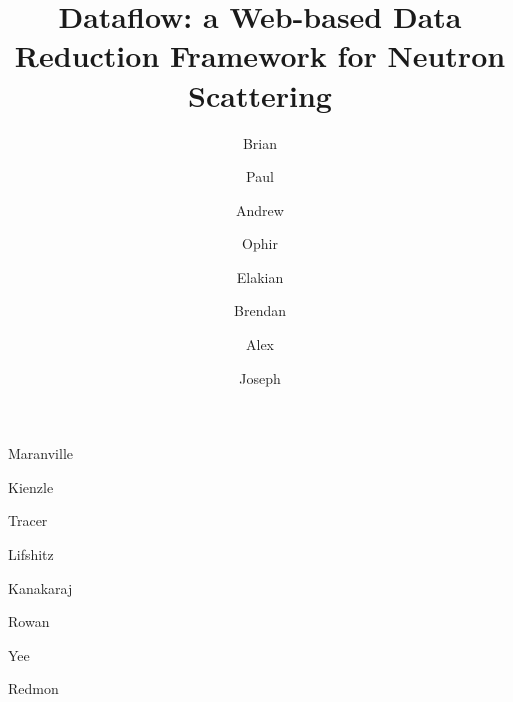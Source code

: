 \documentclass[pdf]{iucr}           %
\begin{document}



\title{Dataflow: a Web-based Data Reduction Framework for Neutron Scattering}


\author[a]{Brian}{Maranville}
\author[a]{Paul}{Kienzle}
\author[a,b]{Andrew}{Tracer}
\author[a]{Ophir}{Lifshitz}
\author[a]{Elakian}{Kanakaraj}
\author[a]{Brendan}{Rowan}
\author[a]{Alex}{Yee}
\author[c]{Joseph}{Redmon}








\end{document}

